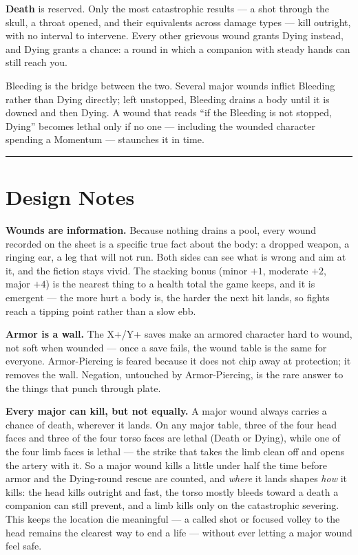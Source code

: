 \textbf{Death} is reserved. Only the most catastrophic results --- a shot through the skull, a throat opened, and their equivalents across damage types --- kill outright, with no interval to intervene. Every other grievous wound grants Dying instead, and Dying grants a chance: a round in which a companion with steady hands can still reach you.

Bleeding is the bridge between the two. Several major wounds inflict Bleeding rather than Dying directly; left unstopped, Bleeding drains a body until it is downed and then Dying. A wound that reads ``if the Bleeding is not stopped, Dying'' becomes lethal only if no one --- including the wounded character spending a Momentum --- staunches it in time.

\medskip\hrule\medskip

\section{Design Notes}

\textbf{Wounds are information.} Because nothing drains a pool, every wound recorded on the sheet is a specific true fact about the body: a dropped weapon, a ringing ear, a leg that will not run. Both sides can see what is wrong and aim at it, and the fiction stays vivid. The stacking bonus (minor $+1$, moderate $+2$, major $+4$) is the nearest thing to a health total the game keeps, and it is emergent --- the more hurt a body is, the harder the next hit lands, so fights reach a tipping point rather than a slow ebb.

\textbf{Armor is a wall.} The X+/Y+ saves make an armored character hard to wound, not soft when wounded --- once a save fails, the wound table is the same for everyone. Armor-Piercing is feared because it does not chip away at protection; it removes the wall. Negation, untouched by Armor-Piercing, is the rare answer to the things that punch through plate.

\textbf{Every major can kill, but not equally.} A major wound always carries a chance of death, wherever it lands. On any major table, three of the four head faces and three of the four torso faces are lethal (Death or Dying), while one of the four limb faces is lethal --- the strike that takes the limb clean off and opens the artery with it. So a major wound kills a little under half the time before armor and the Dying-round rescue are counted, and \textit{where} it lands shapes \textit{how} it kills: the head kills outright and fast, the torso mostly bleeds toward a death a companion can still prevent, and a limb kills only on the catastrophic severing. This keeps the location die meaningful --- a called shot or focused volley to the head remains the clearest way to end a life --- without ever letting a major wound feel safe.

